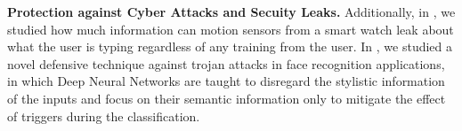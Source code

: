 \textbf{Protection against Cyber Attacks and Secuity Leaks.} 
Additionally, in \cite{wang2015}, we studied how much information can motion sensors from a smart watch leak about what the user is typing regardless of any training from the user. In \cite{villarrealvasquez2020confoc}, we studied a novel defensive technique against trojan attacks in face recognition applications, in which Deep Neural Networks are taught to disregard the stylistic information of the inputs and focus on their semantic information only to mitigate the effect of triggers during the classification.  
